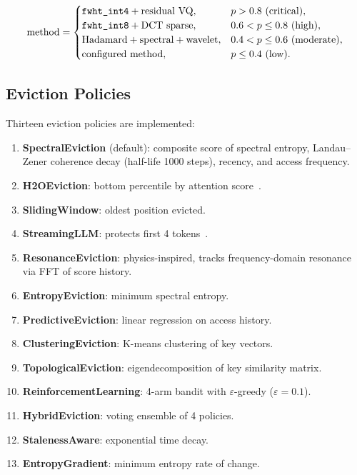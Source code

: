 \documentclass[11pt,a4paper,twocolumn]{article}
\begin{document}
\begin{equation}
	\label{eq:pressure}
	\text{method} =
	\begin{cases}
		\text{\texttt{fwht\_int4}} + \text{residual VQ},    & p > 0.8\ \text{(critical)},         \\
		\text{\texttt{fwht\_int8}} + \text{DCT sparse},     & 0.6 < p \le 0.8\ \text{(high)},     \\
		\text{Hadamard} + \text{spectral} + \text{wavelet}, & 0.4 < p \le 0.6\ \text{(moderate)}, \\
		\text{configured method},                           & p \le 0.4\ \text{(low)}.
	\end{cases}
\end{equation}

\subsection{Eviction Policies}
Thirteen eviction policies are implemented:
\begin{enumerate}
	\item \textbf{SpectralEviction} (default): composite score of spectral entropy, Landau--Zener coherence decay (half-life 1000 steps), recency, and access frequency.
	\item \textbf{H2OEviction}: bottom percentile by attention score~\cite{zhang2023h2o}.
	\item \textbf{SlidingWindow}: oldest position evicted.
	\item \textbf{StreamingLLM}: protects first 4 tokens~\cite{xiao2023streamingllm}.
	\item \textbf{ResonanceEviction}: physics-inspired, tracks frequency-domain resonance via FFT of score history.
	\item \textbf{EntropyEviction}: minimum spectral entropy.
	\item \textbf{PredictiveEviction}: linear regression on access history.
	\item \textbf{ClusteringEviction}: K-means clustering of key vectors.
	\item \textbf{TopologicalEviction}: eigendecomposition of key similarity matrix.
	\item \textbf{ReinforcementLearning}: 4-arm bandit with $\varepsilon$-greedy ($\varepsilon=0.1$).
	\item \textbf{HybridEviction}: voting ensemble of 4 policies.
	\item \textbf{StalenessAware}: exponential time decay.
	\item \textbf{EntropyGradient}: minimum entropy rate of change.
\end{enumerate}
\end{document}
